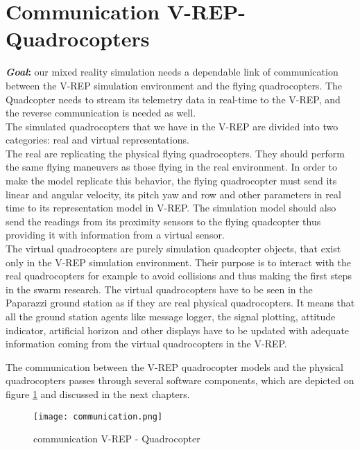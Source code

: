     \section{Communication V-REP-Quadrocopters}
    \label{sec:comm}
    \textbf{\textit{Goal}:} our mixed reality simulation needs a dependable link of communication between the V-REP simulation environment and the flying quadrocopters. 
    The Quadcopter needs to stream its telemetry data in real-time to the V-REP, and the reverse communication is needed as well.\\
    The simulated quadrocopters that we have in the V-REP are divided into two categories: real and virtual representations.\\ 
    The real are replicating the physical flying quadrocopters. They should perform the same flying maneuvers as those flying in the real environment. 
    In order to make the model replicate this behavior, the flying quadrocopter must send its linear and angular velocity, its pitch yaw and row and other parameters in real time to its representation model in V-REP. 
    The simulation model should also send the readings from its proximity sensors to the flying quadcopter thus providing it with information from a virtual sensor. \\
    The virtual quadrocopters are purely simulation quadcopter objects, that exist only in the V-REP simulation environment. Their purpose is to interact with the real quadrocopters for example to avoid collisions and thus making the first steps in the swarm research. The virtual quadrocopters have to be seen in the Paparazzi ground station as if they are real physical quadrocopters. It means that all the ground station agents like message logger, the signal plotting, attitude indicator, artificial horizon and other displays have to be updated with adequate information coming from the virtual quadrocopters in the V-REP.
    
    The communication between the V-REP quadrocopter models and the physical quadrocopters passes through several software components, which are depicted on figure \ref{fig:communication} and discussed in the next chapters.
    
    \begin{figure}[h!]
     \begin{center}
      \texttt{[image: communication.png]}
     \end{center}
      \caption{communication V-REP - Quadrocopter\label{fig:communication}}
    \end{figure}
    
